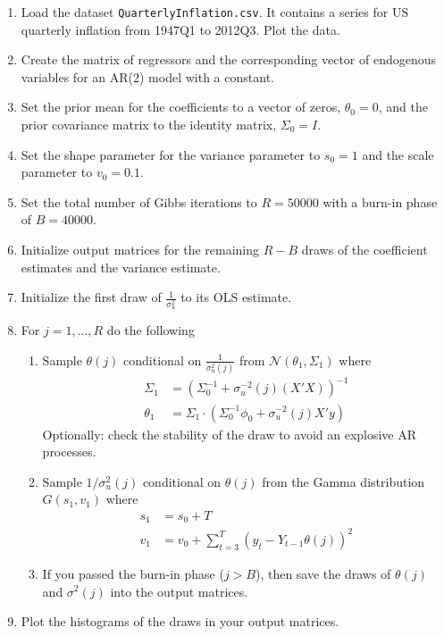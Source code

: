 \begin{enumerate}

\item Load the dataset \texttt{QuarterlyInflation.csv}.
It contains a series for US quarterly inflation from 1947Q1 to 2012Q3.
Plot the data.

\item Create the matrix of regressors and the corresponding vector of endogenous variables for an AR{(2)} model with a constant.

\item Set the prior mean for the coefficients to a vector of zeros, \(\theta_0 = 0\),
  and the prior covariance matrix to the identity matrix, \(\Sigma_{0}=I\).

\item Set the shape parameter for the variance parameter to \(s_0=1\)
  and the scale parameter to \(v_0=0.1\).

\item Set the total number of Gibbs iterations to \(R=50000\) with a burn-in phase of \(B=40000\).

\item Initialize output matrices for the remaining \(R-B\) draws of the coefficient estimates and the variance estimate.

\item Initialize the first draw of \(\frac{1}{\sigma_u^2}\) to its OLS estimate.

\item For \(j=1,\ldots ,R\) do the following

\begin{enumerate}

  \item Sample \(\theta(j)\) conditional on \(\frac{1}{\sigma_u^2(j)}\) from \(\mathcal{N}(\theta_1,\Sigma_{1})\) where
  \begin{align*}
  \Sigma_{1} &= {(\Sigma_{0}^{-1} +\sigma_u^{-2}(j)(X'X))}^{-1}
  \\
  \theta_1 &= \Sigma_{1} \cdot (\Sigma_{0}^{-1}\phi_0 + \sigma_u^{-2}(j) X'y)
  \end{align*}
  Optionally: check the stability of the draw to avoid an explosive AR processes.

  \item Sample \(1/\sigma_u^2(j)\) conditional on \(\theta(j)\) from the Gamma distribution \(G(s_1,v_1)\)
  where
  \begin{align*}
  s_1 &= s_0 + T
  \\
  v_1 &= v_0 + \sum_{t=3}^T {(y_t-Y_{t-1}\theta(j))}^2
  \end{align*}

  \item If you passed the burn-in phase (\(j>B\)),
    then save the draws of \(\theta(j)\) and \(\sigma^2(j)\) into the output matrices.

\end{enumerate}

\item Plot the histograms of the draws in your output matrices.

\end{enumerate}

